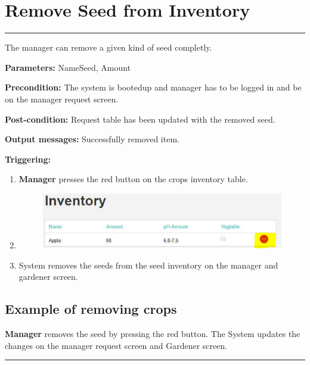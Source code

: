 \break


\section{Remove Seed from Inventory}

\hrule
\hfill
\vspace{0.5cm}

\label{operation:RemoveSeed}

The manager can remove a given kind of seed completly.
\begin{description}

\item \textbf{Parameters:} NameSeed, Amount
\item \textbf{Precondition:} The system is bootedup and manager has to be
logged in and be on the manager request screen.
\item \textbf{Post-condition:} Request table has been updated with the removed
seed.
\item \textbf{Output messages:} Successfully removed item.
\item \textbf{Triggering:}
\begin{enumerate}
\item \textbf{Manager} presses the red button on the crops inventory table.
\item \begin{figure}[H]
\includegraphics[width=1\textwidth]{images/RemoveSeedFromInventory.eps}
\end{figure}
\item System removes the seeds from the seed inventory on the manager and
gardener screen.
\end{enumerate}
\end{description}

\subsection{Example of removing crops}
\textbf{Manager} removes the seed by pressing the red button. The System
updates the changes on the manager request screen and Gardener screen.
\hfill
\vspace{0.5cm}
\hrule


